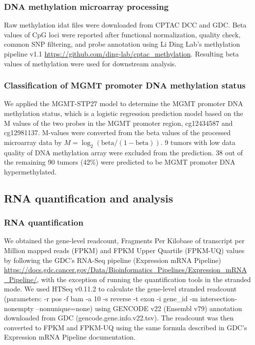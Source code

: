 \subsubsection{DNA methylation microarray processing}
Raw methylation idat files were downloaded from CPTAC DCC and GDC. Beta values of CpG loci were reported after functional normalization, quality check, common SNP filtering, and probe annotation using Li Ding Lab’s methylation pipeline v1.1 \url{https://github.com/ding-lab/cptac_methylation}. Resulting beta values of methylation were used for downstream analysis.

\subsubsection{Classification of MGMT promoter DNA methylation status}
We applied the MGMT-STP27 model \cite{badyp_hegime:MGMTMethylation2012} to determine the MGMT promoter DNA methylation status, which is a logistic regression prediction model based on the M values of the two probes in the MGMT promoter region, cg12434587 and cg12981137. M-values were converted from the beta values of the processed microarray data by $M = \log_2(\text{beta} / (1 - \text{beta}))$. 9 tumors with low data quality of DNA methylation array were excluded from the prediction. 38 out of the remaining 90 tumors (42\%) were predicted to be MGMT promoter DNA hypermethylated.


\subsection{RNA quantification and analysis}

\subsubsection{RNA quantification}
We obtained the gene-level readcount, Fragments Per Kilobase of transcript per Million mapped reads (FPKM) and FPKM Upper Quartile (FPKM-UQ) values by following the GDC’s RNA-Seq pipeline (Expression mRNA Pipeline) \url{https://docs.gdc.cancer.gov/Data/Bioinformatics_Pipelines/Expression_mRNA_Pipeline/}, with the exception of running the quantification tools in the stranded mode. We used HTSeq v0.11.2 \cite{anderss_huberw:HTSeqPython2015} to calculate the gene-level stranded readcount (parameters: -r pos -f bam -a 10 -s reverse -t exon -i gene\_id -m intersection-nonempty --nonunique=none) using GENCODE v22 (Ensembl v79) annotation downloaded from GDC (gencode.gene.info.v22.tsv). The readcount was then converted to FPKM and FPKM-UQ using the same formula described in GDC's Expression mRNA Pipeline documentation.

